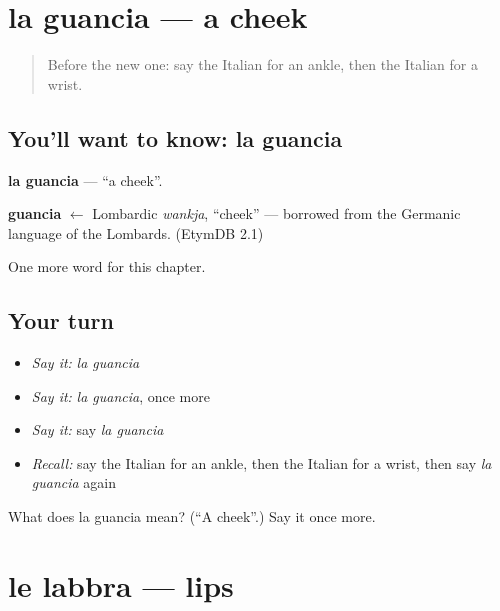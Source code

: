 \section[la guancia]{la guancia — a cheek}

\label{lesson:IT-C122-guancia}



\begin{quote}
Before the new one: say the Italian for an ankle, then the Italian for a wrist.
\end{quote}

\subsection*{You'll want to know: la guancia}
\textbf{la guancia} — \textquotedblleft{}a cheek\textquotedblright{}.

\begin{cousinweb}
\textbf{guancia} $\leftarrow$ Lombardic \emph{wankja}, \textquotedblleft{}cheek\textquotedblright{} — borrowed from the Germanic language of the Lombards. (EtymDB 2.1)
\end{cousinweb}

\begin{grammarlens}[title={What you've built}]
One more word for this chapter.
\end{grammarlens}

\subsection*{Your turn}
\begin{itemize}
\raggedright
  \item \emph{Say it:} \emph{la guancia}
  \item \emph{Say it:} \emph{la guancia}, once more
  \item \emph{Say it:} say \emph{la guancia}
  \item \emph{Recall:} say the Italian for an ankle, then the Italian for a wrist, then say \emph{la guancia} again
\end{itemize}

\begin{tcolorbox}[breakable,colback=teal!4,colframe=teal!35!black,title={Before you move on}]
What does la guancia mean? (\textquotedblleft{}A cheek\textquotedblright{}.) Say it once more.
\end{tcolorbox}
\section[le labbra]{le labbra — lips}

